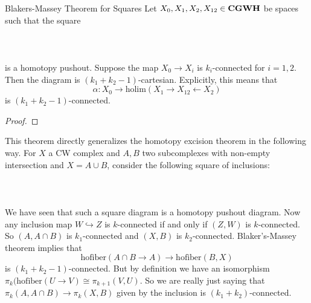 \documentclass[a4paper]{article}
\begin{document}
\begin{thm}{Blakers-Massey Theorem for Squares}{} Let $X_0,X_1,X_2,X_{12}\in\bold{CGWH}$ be spaces such that the square \\~\\
\\~\\
is a homotopy pushout. Suppose the map $X_0\to X_i$ is $k_i$-connected for $i=1,2$. Then the diagram is $(k_1+k_2-1)$-cartesian. Explicitly, this means that $$\alpha:X_0\to\text{holim}(X_1\rightarrow X_{12}\leftarrow X_2)$$ is $(k_1+k_2-1)$-connected. \tcbline
\begin{proof}

\end{proof}
\end{thm}

This theorem directly generalizes the homotopy excision theorem in the following way. For $X$ a CW complex and $A,B$ two subcomplexes with non-empty intersection and $X=A\cup B$, consider the following square of inclusions: \\~\\
\\~\\
We have seen that such a square diagram is a homotopy pushout diagram. Now any inclusion map $W\hookrightarrow Z$ is $k$-connected if and only if $(Z,W)$ is $k$-connected. So $(A,A\cap B)$ is $k_1$-connected and $(X,B)$ is $k_2$-connected. Blaker's-Massey theorem implies that $$\text{hofiber}(A\cap B\to A)\to\text{hofiber}(B,X)$$ is $(k_1+k_2-1)$-connected. But by definition we have an isomorphism $\pi_k(\text{hofiber}(U\to V)\cong\pi_{k+1}(V,U)$. So we are really just saying that $\pi_k(A,A\cap B)\to\pi_k(X,B)$ given by the inclusion is $(k_1+k_2)$-connected. 
\end{document}
